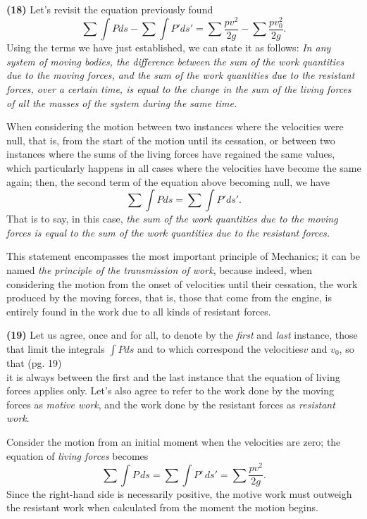 \documentclass{book}
\begin{document}
\textbf{(18)} Let's revisit the equation previously found
\begin{equation}
    \sum \int Pds - \sum \int P'ds' = \sum \frac{pv^2}{2g} - \sum \frac{pv_0^2}{2g}.
\end{equation}
Using the terms we have just established, we can state it as follows: \textit{In any system of moving bodies, the difference between the sum of the work quantities due to the moving forces, and the sum of the work quantities due to the resistant forces, over a certain time, is equal to the change in the sum of the living forces of all the masses of the system during the same time.}

When considering the motion between two instances where the velocities were null, that is, from the start of the motion until its cessation, or between two instances where the sums of the living forces have regained the same values, which particularly happens in all cases where the velocities have become the same again; then, the second term of the equation above becoming null, we have
\begin{equation}
    \sum \int Pds = \sum \int P'ds'.
\end{equation}
That is to say, in this case, \textit{the sum of the work quantities due to the moving forces is equal to the sum of the work quantities due to the resistant forces.}

This statement encompasses the most important principle of Mechanics; it can be named \textit{the principle of the transmission of work}, because indeed, when considering the motion from the onset of velocities until their cessation, the work produced by the moving forces, that is, those that come from the engine, is entirely found in the work due to all kinds of resistant forces.

\textbf{(19)} Let us agree, once and for all, to denote by the \textit{first} and \textit{last} instance, those that limit the integrals \(\int Pds\) and to which correspond the velocities\(v\) and \(v_0\), so that 
\newpage
(pg. 19)\\
it is always between the first and the last instance that the equation of living forces applies only. Let's also agree to refer to the work done by the moving forces as \textit{motive work}, and the work done by the resistant forces as \textit{resistant work}.

Consider the motion from an initial moment when the velocities are zero; the equation of \textit{living forces} becomes
\[\sum \int P \, ds = \sum \int P' \, ds' = \sum \frac{pv^2}{2g} .\]
Since the right-hand side is necessarily positive, the motive work must outweigh the resistant work when calculated from the moment the motion begins.
\end{document}
